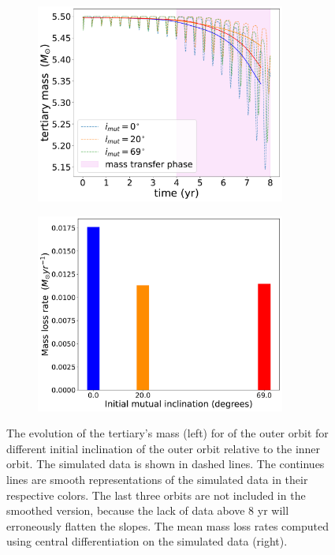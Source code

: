 \begin{figure}[!htb]
    \centering
    \begin{subfigure}{.5\textwidth}
    \centering
    \includegraphics[width=0.9\textwidth]{Thesis/graphs/inclination_case/inclination_mass_loss.pdf}
    \end{subfigure}%
    \begin{subfigure}{.5\textwidth}
    \centering
    \includegraphics[width=0.9\textwidth]{Thesis/graphs/inclination_case/incliantion_giant_mass_loss_rate.pdf}
    \end{subfigure}
    \caption{ The evolution of the tertiary's mass (left) for of the outer orbit for different initial inclination of the outer orbit relative to the inner orbit. The simulated data is shown in dashed lines. The continues lines are smooth representations of the simulated data in their respective colors. The last three orbits are not included in the smoothed version, because the lack of data above $8$ yr will erroneously flatten the slopes. The mean mass loss rates computed using central differentiation on the simulated data (right).}
    \label{fig:incliantion_tertiary_mass}
\end{figure}

